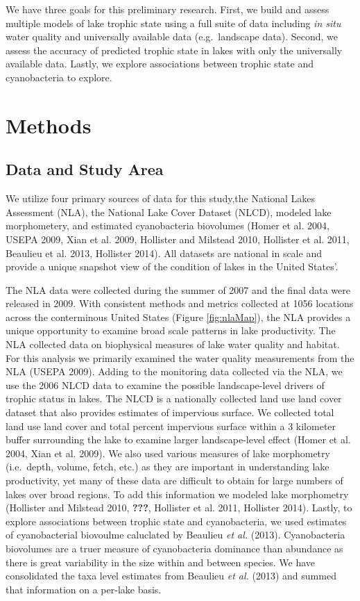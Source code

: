 \documentclass[11pt,]{article}
\begin{document}
We have three goals for this preliminary research. First, we build and
assess multiple models of lake trophic state using a full suite of data
including \emph{in situ} water quality and universally available data
(e.g.~landscape data). Second, we assess the accuracy of predicted
trophic state in lakes with only the universally available data. Lastly,
we explore associations between trophic state and cyanobacteria to
explore.

\section{Methods}\label{methods}

\subsection{Data and Study Area}\label{data-and-study-area}

We utilize four primary sources of data for this study,the National
Lakes Assessment (NLA), the National Lake Cover Dataset (NLCD), modeled
lake morphometery, and estimated cyanobacteria biovolumes (Homer et al.
2004, USEPA 2009, Xian et al. 2009, Hollister and Milstead 2010,
Hollister et al. 2011, Beaulieu et al. 2013, Hollister 2014). All
datasets are national in scale and provide a unique snapshot view of the
condition of lakes in the United States'.

The NLA data were collected during the summer of 2007 and the final data
were released in 2009. With consistent methods and metrics collected at
1056 locations across the conterminous United States (Figure
\ref{fig:nlaMap}), the NLA provides a unique opportunity to examine
broad scale patterns in lake productivity. The NLA collected data on
biophysical measures of lake water quality and habitat. For this
analysis we primarily examined the water quality measurements from the
NLA (USEPA 2009). Adding to the monitoring data collected via the NLA,
we use the 2006 NLCD data to examine the possible landscape-level
drivers of trophic status in lakes. The NLCD is a nationally collected
land use land cover dataset that also provides estimates of impervious
surface. We collected total land use land cover and total percent
impervious surface within a 3 kilometer buffer surrounding the lake to
examine larger landscape-level effect (Homer et al. 2004, Xian et al.
2009). We also used various measures of lake morphometry (i.e.~depth,
volume, fetch, etc.) as they are important in understanding lake
productivity, yet many of these data are difficult to obtain for large
numbers of lakes over broad regions. To add this information we modeled
lake morphometry (Hollister and Milstead 2010, {\textbf{???}}, Hollister
et al. 2011, Hollister 2014). Lastly, to explore associations between
trophic state and cyanobacteria, we used estimates of cyanobacterial
biovoulme caluclated by Beaulieu \emph{et al.} (2013). Cyanobacteria
biovolumes are a truer measure of cyanobacteria dominance than abundance
as there is great variability in the size within and between species. We
have consolidated the taxa level estimates from Beaulieu \emph{et al.}
(2013) and summed that information on a per-lake basis.
\end{document}
